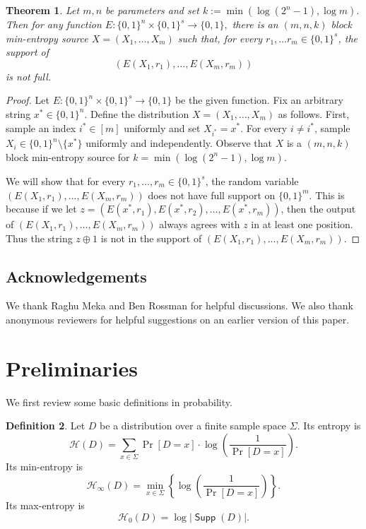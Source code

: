 \documentclass[11pt]{article}
\numberwithin{equation}{section}
\newtheorem{theorem}{Theorem}[section]
\theoremstyle{definition}
\newtheorem{definition}[theorem]{Definition}
\theoremstyle{plain}
\def\entropy{\mathcal{H}}
\DeclareMathOperator{\Supp}{\mathsf{Supp}}  %
\begin{document}
\begin{theorem}
\label{thm: barrier}
Let $m,n$ be parameters %
%
and set $k:= \min(\log (2^n - 1), \log m).$
%
Then for any function
$E:\{0,1\}^{n}\times\{0,1\}^{s}\rightarrow\{0,1\},$ there is
an $(m,n,k)$ block min-entropy source $X=(X_1,\dots,X_m)$ such that,
for every $r_1,\dots r_{m}\in\{0,1\}^{s}$, the support of
\[
(E(X_{1},r_1),\dots,E(X_{m}, r_{m}))
\]
is not full.
\end{theorem}

\begin{proof}
Let $E:\{0,1\}^n \times \{0,1\}^s \rightarrow \{0,1\}$ be the given function. Fix an arbitrary string $x^{*} \in \{0,1\}^n$. Define the distribution $X=(X_1,\ldots,X_m)$ as follows. First, sample an index $i^{*}\in [m]$ uniformly and set $X_{i^{*}} = x^{*}$.
For every $i\neq i^{*}$, sample $X_{i}\in\{0,1\}^{n}\setminus\{x^{*}\}$ uniformly and independently.
Observe that $X$ is a $(m,n,k)$ block min-entropy source for 
%
$k = \min(\log (2^n-1), \log m). $   %

We will show that for every $r_1,\ldots,r_m \in \{0,1\}^s$, the random variable $(E(X_1,r_1),\ldots,E(X_m,r_m))$ does not have full support on $\{0,1\}^m$. This is because if we let $z = (E(x^{*},r_1), E(x^{*},r_2),\ldots,E(x^{*},r_m))$, then the output of $(E(X_1,r_1),\ldots,E(X_m,r_m))$ always agrees with $z$ in at least one position. Thus the string $z\oplus 1$ is not in the support of $(E(X_1,r_1),\ldots,E(X_m,r_m))$.


\end{proof}

%
%
%
%

\subsection*{Acknowledgements}
We thank Raghu Meka and Ben Rossman for helpful discussions. We also thank anonymous reviewers for helpful suggestions on an earlier version of this paper.


\section{Preliminaries}
\label{sec:pre}

%
%
%
We first review some basic definitions in probability.
\begin{definition}
Let $D$ be a distribution over a finite  
sample space %
$\Sigma$.   %
Its entropy is  %
\[
\entropy(D) = \sum_{x\in\Sigma}\Pr[D=x]\cdot\log \left(\frac{1}{\Pr[D=x]}\right).
\]
Its min-entropy  is
\[
\entropy_{\infty}(D) = \min_{x\in\Sigma}\left\{\log \left(\frac{1}{\Pr[D=x]}\right)\right\}.
\]
Its max-entropy is
\[
%
\entropy_{0}(D) =\log |\Supp(D)|. %
\]
\end{definition}
\end{document}
